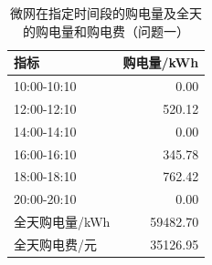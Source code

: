 \begin{table}[H]
\centering
{}
\begin{tabular}{lr}
\toprule
指标 & 购电量/kWh \\
\midrule
10:00-10:10 & 0.00 \\
12:00-12:10 & 520.12 \\
14:00-14:10 & 0.00 \\
16:00-16:10 & 345.78 \\
18:00-18:10 & 762.42 \\
20:00-20:10 & 0.00 \\
\midrule
全天购电量/kWh & 59482.70 \\
全天购电费/元 & 35126.95 \\
\bottomrule
\end{tabular}
\caption{微网在指定时间段的购电量及全天的购电量和购电费（问题一）}
\label{tab:m1-q1}
\end{table}
\par{}
